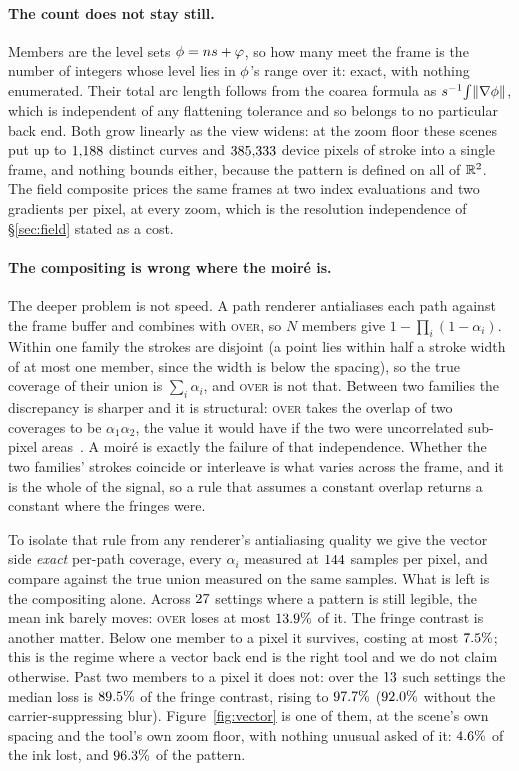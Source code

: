 \paragraph{The count does not stay still.}
Members are the level sets $\phi = ns + \varphi$, so how many meet the frame is
the number of integers whose level lies in $\phi$'s range over it: exact, with
nothing enumerated. Their total arc length follows from the coarea formula as
$s^{-1}\!\int\lVert\nabla\phi\rVert$, which is independent of any flattening
tolerance and so belongs to no particular back end. Both grow linearly as the
view widens: at the zoom floor these scenes put up to $1{,}188$ distinct
curves and $385{,}333$ device pixels of stroke into a single frame, and
nothing bounds either, because the pattern is defined on all of $\mathbb{R}^2$. The field
composite prices the same frames at two index evaluations and two gradients per
pixel, at every zoom, which is the resolution independence of \S\ref{sec:field}
stated as a cost.

\paragraph{The compositing is wrong where the moir\'e is.}
The deeper problem is not speed. A path renderer antialiases each path against
the frame buffer and combines with \textsc{over}, so $N$ members give
$1-\prod_i(1-\alpha_i)$. Within one family the strokes are disjoint (a point
lies within half a stroke width of at most one member, since the width is below
the spacing), so the true coverage of their union is $\sum_i \alpha_i$, and
\textsc{over} is not that. Between two families the discrepancy is sharper and it
is structural: \textsc{over} takes the overlap of two coverages to be
$\alpha_1\alpha_2$, the value it would have if the two were uncorrelated
sub-pixel areas~\cite{PorterDuff1984}. A moir\'e is exactly the failure of that
independence. Whether the two families' strokes coincide or interleave is what
varies across the frame, and it is the whole of the signal, so a rule that
assumes a constant overlap returns a constant where the fringes were.

To isolate that rule from any renderer's antialiasing quality we give the vector
side \emph{exact} per-path coverage, every $\alpha_i$ measured at $144$
samples per pixel, and compare against the true union measured on the same
samples. What is left is the compositing alone. Across $27$ settings
where a pattern is still legible, the mean ink barely moves: \textsc{over} loses
at most $13.9\%$ of it. The fringe contrast is another matter. Below one
member to a pixel it survives, costing at most $7.5\%$; this is
the regime where a vector back end is the right tool and we do not claim
otherwise. Past two members to a pixel it does not: over the $13$
such settings the median loss is $89.5\%$ of the fringe contrast,
rising to $97.7\%$ ($92.0\%$ without the
carrier-suppressing blur). Figure~\ref{fig:vector} is one of them, at the scene's
own spacing and the tool's own zoom floor, with nothing unusual asked of it:
$4.6\%$ of the ink lost, and $96.3\%$ of the pattern.

